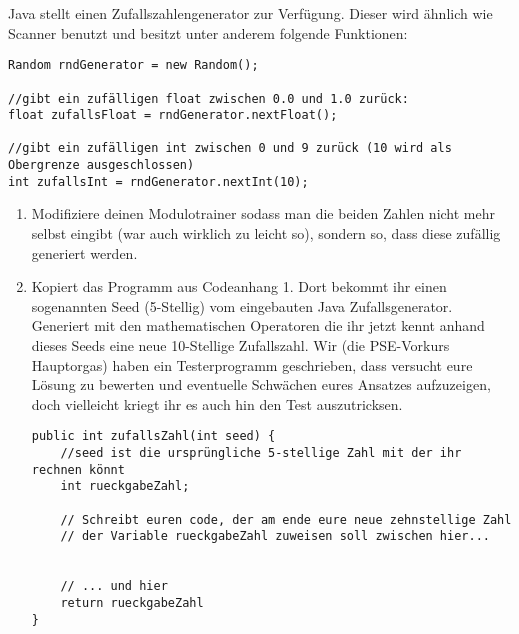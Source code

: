 \documentclass{../../sheet}
\begin{document}
\newpage
{}
Java stellt einen Zufallszahlengenerator zur Verfügung. Dieser wird ähnlich wie Scanner benutzt und besitzt unter anderem folgende Funktionen:

\begin{verbatim}
Random rndGenerator = new Random();

//gibt ein zufälligen float zwischen 0.0 und 1.0 zurück:
float zufallsFloat = rndGenerator.nextFloat();

//gibt ein zufälligen int zwischen 0 und 9 zurück (10 wird als Obergrenze ausgeschlossen)
int zufallsInt = rndGenerator.nextInt(10);
\end{verbatim}

\begin{enumerate}
    \item Modifiziere deinen Modulotrainer sodass man die beiden Zahlen nicht mehr selbst eingibt (war auch wirklich zu leicht so), sondern so, dass diese zufällig generiert werden. 
    \item Kopiert das Programm aus Codeanhang 1. Dort bekommt ihr einen sogenannten Seed (5-Stellig) vom eingebauten Java Zufallsgenerator. Generiert mit den mathematischen Operatoren die ihr jetzt kennt anhand dieses Seeds eine neue 10-Stellige Zufallszahl. Wir (die PSE-Vorkurs Hauptorgas) haben ein Testerprogramm geschrieben, dass versucht eure Lösung zu bewerten und eventuelle Schwächen eures Ansatzes aufzuzeigen, doch vielleicht kriegt ihr es auch hin den Test auszutricksen.
    
    \begin{verbatim}
public int zufallsZahl(int seed) {
    //seed ist die ursprüngliche 5-stellige Zahl mit der ihr rechnen könnt
    int rueckgabeZahl;

    // Schreibt euren code, der am ende eure neue zehnstellige Zahl
    // der Variable rueckgabeZahl zuweisen soll zwischen hier...


    // ... und hier
    return rueckgabeZahl
}
    \end{verbatim}
\end{enumerate}
\end{document}
